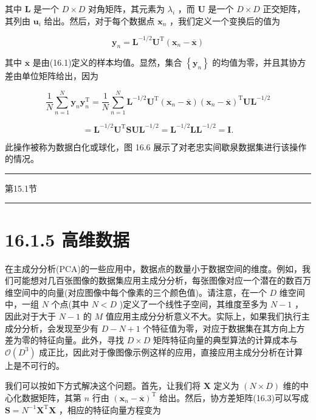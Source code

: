 \documentclass[10pt]{report}
\newcommand{\HRule}{\begin{center}\rule{0.9\linewidth}{0.2mm}\end{center}}
\begin{document}
其中 \(\mathbf{L}\) 是一个 \(D \times  D\) 对角矩阵，其元素为 \({\lambda }_{i}\) ，而 \(\mathbf{U}\) 是一个 \(D \times  D\) 正交矩阵，其列由 \({\mathbf{u}}_{i}\) 给出。然后，对于每个数据点 \({\mathbf{x}}_{n}\) ，我们定义一个变换后的值为

\[
{\mathbf{y}}_{n} = {\mathbf{L}}^{-1/2}{\mathbf{U}}^{\mathrm{T}}\left( {{\mathbf{x}}_{n} - \overline{\mathbf{x}}}\right)  \tag{16.24}
\]

其中 \(\overline{\mathbf{x}}\) 是由(16.1)定义的样本均值。显然，集合 \(\left\{  {\mathbf{y}}_{n}\right\}\) 的均值为零，并且其协方差由单位矩阵给出，因为

\[
\frac{1}{N}\mathop{\sum }\limits_{{n = 1}}^{N}{\mathbf{y}}_{n}{\mathbf{y}}_{n}^{\mathrm{T}} = \frac{1}{N}\mathop{\sum }\limits_{{n = 1}}^{N}{\mathbf{L}}^{-1/2}{\mathbf{U}}^{\mathrm{T}}\left( {{\mathbf{x}}_{n} - \overline{\mathbf{x}}}\right) {\left( {\mathbf{x}}_{n} - \overline{\mathbf{x}}\right) }^{\mathrm{T}}\mathbf{U}{\mathbf{L}}^{-1/2}
\]

\[
= {\mathbf{L}}^{-1/2}{\mathbf{U}}^{\mathrm{T}}\mathbf{S}\mathbf{U}{\mathbf{L}}^{-1/2} = {\mathbf{L}}^{-1/2}\mathbf{L}{\mathbf{L}}^{-1/2} = \mathbf{I}. \tag{16.25}
\]

此操作被称为数据白化或球化，图 16.6 展示了对老忠实间歇泉数据集进行该操作的情况。

\HRule

第15.1节

\HRule

\section*{16.1.5 高维数据}

在主成分分析(PCA)的一些应用中，数据点的数量小于数据空间的维度。例如，我们可能想对几百张图像的数据集应用主成分分析，每张图像对应一个潜在的数百万维空间中的向量(对应图像中每个像素的三个颜色值)。请注意，在一个 \(D\) 维空间中，一组 \(N\) 个点(其中 \(N < D\) )定义了一个线性子空间，其维度至多为 \(N - 1\) ，因此对于大于 \(N - 1\) 的 \(M\) 值应用主成分分析意义不大。实际上，如果我们执行主成分分析，会发现至少有 \(D - N + 1\) 个特征值为零，对应于数据集在其方向上方差为零的特征向量。此外，寻找 \(D \times  D\) 矩阵特征向量的典型算法的计算成本与 \(\mathcal{O}\left( {D}^{3}\right)\) 成正比，因此对于像图像示例这样的应用，直接应用主成分分析在计算上是不可行的。

我们可以按如下方式解决这个问题。首先，让我们将 \(\mathbf{X}\) 定义为 \(\left( {N \times  D}\right)\) 维的中心化数据矩阵，其第 \(n\) 行由 \({\left( {\mathbf{x}}_{n} - \overline{\mathbf{x}}\right) }^{\mathrm{T}}\) 给出。然后，协方差矩阵(16.3)可以写成 \(\mathbf{S} = {N}^{-1}{\mathbf{X}}^{\mathrm{T}}\mathbf{X}\) ，相应的特征向量方程变为
\end{document}
